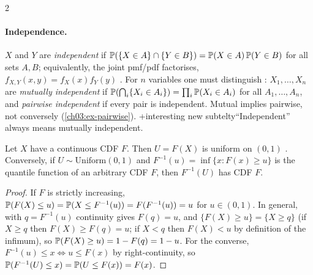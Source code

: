 \begin{paracol}{2}
\paragraph{Independence.} $X$ and $Y$ are \emph{independent} if
$\mathbb{P}(\{X\in A\}\cap\{Y\in B\})=\mathbb{P}(X\in A)\,\mathbb{P}(Y\in B)$ for all sets $A,B$; equivalently, the joint
pmf/pdf factorises, $f_{X,Y}(x,y)=f_X(x)f_Y(y)$ . For $n$ variables one must distinguish
: $X_1,\dots,X_n$ are \emph{mutually independent} if
$\mathbb{P}(\bigcap_i\{X_i\in A_i\})=\prod_i\mathbb{P}(X_i\in A_i)$ for all $A_1,\dots,A_n$, and \emph{pairwise
independent} if every pair is independent. Mutual implies pairwise, not conversely
(\cref{ch03:ex-pairwise}). \note+{interesting new subtelty}``Independent'' always means mutually independent.

\begin{proposition}\label{ch03:prop-pit}
Let $X$ have a continuous CDF $F$. Then $U=F(X)$ is uniform on $(0,1)$ . Conversely, if
$U\sim\mathrm{Uniform}(0,1)$ and $F^{-1}(u)=\inf\{x:F(x)\ge u\}$ is the quantile function of an
arbitrary CDF $F$, then $F^{-1}(U)$ has CDF $F$.
\end{proposition}
\begin{proof}
If $F$ is strictly increasing, $\mathbb{P}(F(X)\le u)=\mathbb{P}(X\le F^{-1}(u))=F(F^{-1}(u))=u$ for $u\in(0,1)$. In
general, with $q=F^{-1}(u)$ continuity gives $F(q)=u$, and $\{F(X)\ge u\}=\{X\ge q\}$ (if $X\ge q$ then
$F(X)\ge F(q)=u$; if $X<q$ then $F(X)<u$ by definition of the infimum), so
$\mathbb{P}(F(X)\ge u)=1-F(q)=1-u$. For the converse, $F^{-1}(u)\le x\iff u\le F(x)$ by right-continuity, so
$\mathbb{P}(F^{-1}(U)\le x)=\mathbb{P}(U\le F(x))=F(x)$.
\end{proof}


\end{paracol}
